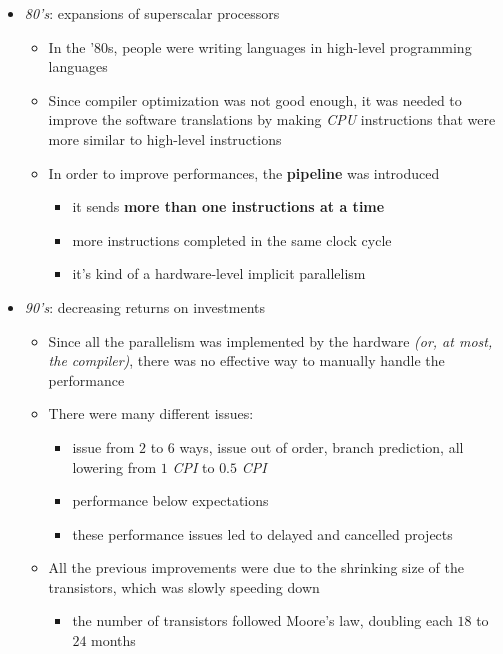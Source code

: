 \documentclass[english]{article}
\begin{document}
\begin{itemize}
  \item \textit{80's}: expansions of superscalar processors
        \begin{itemize}
          \item In the '80s, people were writing languages in high-level programming languages
          \item Since compiler optimization was not good enough, it was needed to improve the software translations by making \textit{CPU} instructions that were more similar to high-level instructions
          \item In order to improve performances, the \textbf{pipeline} was introduced
                \begin{itemize}
                  \item it sends \textbf{more than one instructions at a time}
                  \item more instructions completed in the same clock cycle
                  \item it's kind of a hardware-level implicit parallelism
                \end{itemize}
        \end{itemize}
  \item \textit{90's}: decreasing returns on investments
        \begin{itemize}
          \item Since all the parallelism was implemented by the hardware \textit{(or, at most, the compiler)}, there was no effective way to manually handle the performance
          \item There were many different issues:
                \begin{itemize}
                  \item issue from \(2\) to \(6\) ways, issue out of order, branch prediction, all lowering from \(1\) \textit{CPI} to \(0.5\) \textit{CPI}
                  \item performance below expectations
                  \item these performance issues led to delayed and cancelled projects
                \end{itemize}
          \item All the previous improvements were due to the shrinking size of the transistors, which was slowly speeding down
                \begin{itemize}
                  \item the number of transistors followed Moore's law, doubling each \(18\) to \(24\) months

\end{itemize}
\end{itemize}
\end{itemize}
\end{document}
